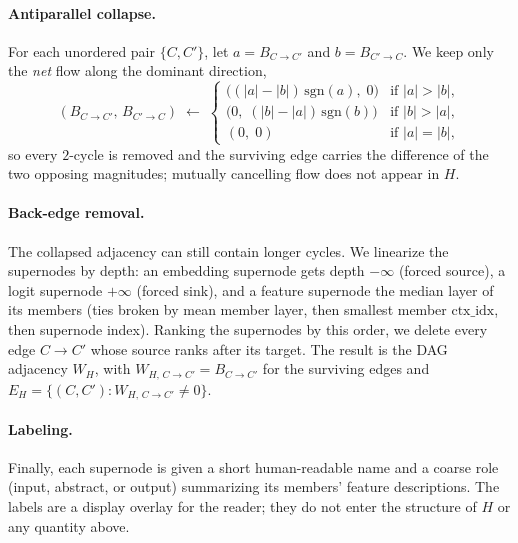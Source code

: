 \documentclass[../main.tex]{subfiles}
\begin{document}
\paragraph{Antiparallel collapse.}
For each unordered pair $\{C, C'\}$, let $a = B_{C \to C'}$ and $b = B_{C' \to C}$.
We keep only the \emph{net} flow along the dominant direction,
\begin{equation}
(B_{C \to C'},\, B_{C' \to C}) \;\longleftarrow\;
\begin{cases}
\bigl((|a| - |b|)\,\mathrm{sgn}(a),\; 0\bigr) & \text{if } |a| > |b|, \\[2pt]
\bigl(0,\; (|b| - |a|)\,\mathrm{sgn}(b)\bigr) & \text{if } |b| > |a|, \\[2pt]
(0,\; 0)                                       & \text{if } |a| = |b|,
\end{cases}
\label{eq:antiparallel}
\end{equation}
so every $2$-cycle is removed and the surviving edge carries the difference of the
two opposing magnitudes; mutually cancelling flow does not appear in $H$.

\paragraph{Back-edge removal.}
The collapsed adjacency can still contain longer cycles. We linearize the
supernodes by depth: an embedding supernode gets depth $-\infty$ (forced source),
a logit supernode $+\infty$ (forced sink), and a feature supernode the median
layer of its members (ties broken by mean member layer, then smallest member
$\text{ctx\_idx}$, then supernode index). Ranking the supernodes by this order, we
delete every edge $C \to C'$ whose source ranks after its target. The result is the
DAG adjacency $W_H$, with $W_{H,\, C \to C'} = B_{C \to C'}$ for the surviving
edges and $E_H = \{(C, C') : W_{H,\, C \to C'} \ne 0\}$.

\paragraph{Labeling.}
Finally, each supernode is given a short human-readable name and a coarse role
(input, abstract, or output) summarizing its members' feature descriptions. The
labels are a display overlay for the reader; they do not enter the structure of
$H$ or any quantity above.
\end{document}
